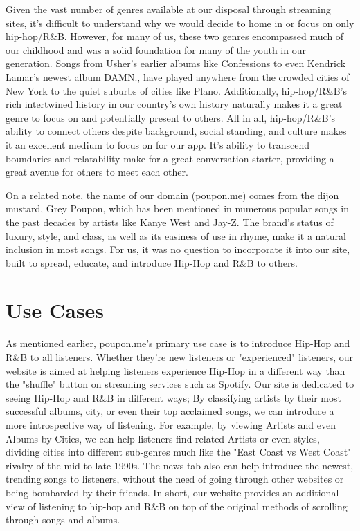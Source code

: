 \documentclass{scrartcl}
\begin{document}
    Given the vast number of genres available at our disposal through streaming sites, it's difficult to understand why we would decide to home in or focus on only hip-hop/R\&B. However, for many of us, these two genres encompassed much of our childhood and was a solid foundation for many of the youth in our generation.
    Songs from Usher's earlier albums like Confessions to even Kendrick Lamar's newest album DAMN., have played anywhere from the crowded cities of New York to the quiet suburbs of cities like Plano.
    Additionally, hip-hop/R\&B's rich intertwined history in our country's own history naturally makes it a great genre to focus on and potentially present to others.
    All in all, hip-hop/R\&B's ability to connect others despite background, social standing, and culture makes it an excellent medium to focus on for our app.
    It's ability to transcend boundaries and relatability make for a great conversation starter, providing a great avenue for others to meet each other.

    On a related note, the name of our domain (poupon.me) comes from the dijon mustard, Grey Poupon, which has been mentioned in numerous popular songs in the past decades by artists like Kanye West and Jay-Z.
    The brand's status of luxury, style, and class, as well as its easiness of use in rhyme, make it a natural inclusion in most songs.
    For us, it was no question to incorporate it into our site, built to spread, educate, and introduce Hip-Hop and R\&B to others.

    \section{Use Cases}\label{sec:useCases}
    \indent As mentioned earlier, poupon.me's primary use case is to introduce Hip-Hop and R\&B to all listeners.
    Whether they're new listeners or "experienced" listeners, our website is aimed at helping listeners experience Hip-Hop in a different way than the "shuffle" button on streaming services such as Spotify.
    Our site is dedicated to seeing Hip-Hop and R\&B in different ways;
    By classifying artists by their most successful albums, city, or even their top acclaimed songs, we can introduce a more introspective way of listening.
    For example, by viewing Artists and even Albums by Cities, we can help listeners find related Artists or even styles, dividing cities into different sub-genres much like the "East Coast vs West Coast" rivalry of the mid to late 1990s.
    The news tab also can help introduce the newest, trending songs to listeners, without the need of going through other websites or being bombarded by their friends.
    In short, our website provides an additional view of listening to hip-hop and R\&B on top of the original methods of scrolling through songs and albums.
\end{document}
